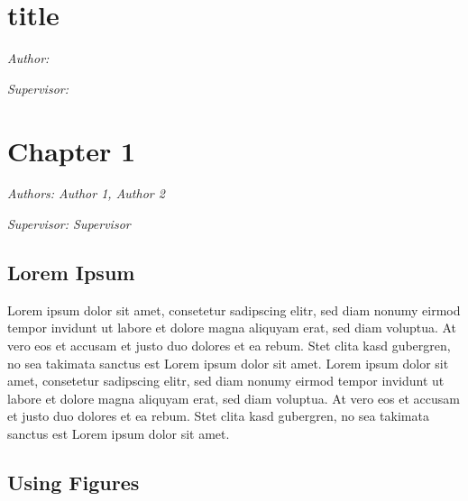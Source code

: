 \documentclass[
]{krantz}
\begin{document}
\hypertarget{title-2}{%
\chapter{title}\label{title-2}}

\emph{Author: }

\emph{Supervisor: }

\hypertarget{chapter-1-1}{%
\chapter{Chapter 1}\label{chapter-1-1}}

\emph{Authors: Author 1, Author 2}

\emph{Supervisor: Supervisor}

\hypertarget{lorem-ipsum-1}{%
\section{Lorem Ipsum}\label{lorem-ipsum-1}}

Lorem ipsum dolor sit amet, consetetur sadipscing elitr, sed diam nonumy eirmod tempor invidunt ut labore et dolore magna aliquyam erat, sed diam voluptua. At vero eos et accusam et justo duo dolores et ea rebum. Stet clita kasd gubergren, no sea takimata sanctus est Lorem ipsum dolor sit amet. Lorem ipsum dolor sit amet, consetetur sadipscing elitr, sed diam nonumy eirmod tempor invidunt ut labore et dolore magna aliquyam erat, sed diam voluptua. At vero eos et accusam et justo duo dolores et ea rebum. Stet clita kasd gubergren, no sea takimata sanctus est Lorem ipsum dolor sit amet.

\citet{rlang}

\hypertarget{using-figures-1}{%
\section{Using Figures}\label{using-figures-1}}
\end{document}

